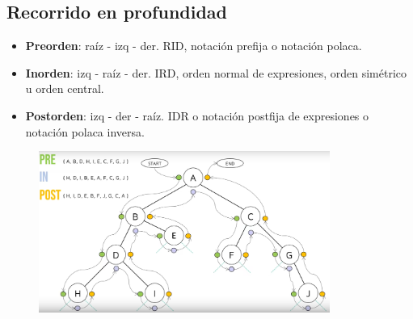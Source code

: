 \documentclass{article}
\begin{document}
\subsection{Recorrido en profundidad}

\begin{itemize}
    \item \textbf{Preorden}: raíz - izq - der. RID, notación prefija o notación polaca.

    \item \textbf{Inorden}: izq - raíz - der. IRD, orden normal de expresiones, orden simétrico u orden central.

    \item \textbf{Postorden}: izq - der - raíz. IDR o notación postfija de expresiones o notación polaca inversa.
\end{itemize}

\begin{figure}[h]
    \centering
    \includegraphics[width=0.85\textwidth]{img-t2/img_137_14.png}
\end{figure}

\newpage
\end{document}
